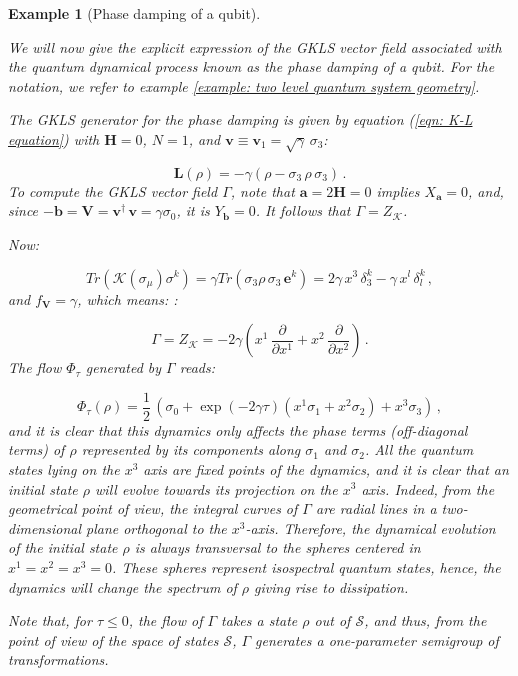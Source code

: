 \documentclass[11pt]{article}
\newcommand{\be}{\begin{equation}}
\newcommand{\ee}{\end{equation}}
\newcommand{\stsp}{\mathcal{S}}
\newtheorem{exmp}{Example}
\begin{document}
\begin{exmp}[Phase damping of a qubit]\label{example: Phase damping of a qubit}

We will now give the explicit expression of the GKLS vector field associated with the quantum dynamical process known as the phase damping of a qubit.
For the notation, we refer to example  \ref{example: two level quantum system geometry}.

The GKLS generator for the phase damping is given by equation (\ref{eqn: K-L equation}) with $\mathbf{H}=0$, $N=1$,  and $\mathbf{v}\equiv\mathbf{v}_{1}=\sqrt{\gamma}\,\sigma_{3}$:

\be
\mathbf{L}(\rho)=- \gamma \left(\rho - \sigma_{3}\,\rho\,\sigma_{3}\right)\,.
\ee
To compute the GKLS vector field $\Gamma$, note that $\mathbf{a}=2\mathbf{H}=0$ implies $X_{\mathbf{a}}=0$, and, since $-\mathbf{b}=\mathbf{V}=\mathbf{v}^{\dagger}\,\mathbf{v}=\gamma\sigma_{0}$, it is $Y_{\mathbf{b}}=0$.
It follows that $\Gamma = Z_{\mathcal{K}}$.

Now:

\be
Tr\left(\mathcal{K}(\sigma_{\mu})\sigma^{k}\right)= \gamma Tr\left(\sigma_{3}\rho\,\sigma_{3}\,\mathbf{e}^{k}\right)= 2\gamma\,x^{3}\,\delta_{3}^{k} - \gamma \, x^{l}\,\delta_{l}^{k}\,,
\ee
and $f_{\mathbf{V}}= \gamma$, which means: 
:

\be\label{eqn: GKLS vector field phase damping qubit}
\Gamma = Z_{\mathcal{K}} = -2\gamma\left(x^{1}\,\frac{\partial}{\partial x^{1}} + x^{2}\,\frac{\partial}{\partial x^{2}}\right)\,.
\ee
The flow $\Phi_{\tau}$ generated by $\Gamma$ reads:

\be
\Phi_{\tau}(\rho)=\frac{1}{2}\,\left(\sigma_{0} + \exp(-2\gamma\tau)\left(x^{1}\sigma_{1} + x^{2}\sigma_{2}\right) + x^{3}\sigma_{3}\right)\,,
\ee
and it is clear that this dynamics only affects the phase terms (off-diagonal terms) of $\rho$ represented by its components along $\sigma_{1}$ and $\sigma_{2}$.
All the quantum states lying on the $x^{3}$ axis are fixed points of the dynamics, and it is clear that an initial state $\rho$ will evolve towards its projection on the $x^{3}$ axis.
Indeed, from the geometrical point of view, the integral curves of $\Gamma$ are radial lines in a two-dimensional plane orthogonal to the $x^{3}$-axis.
Therefore, the dynamical evolution of the initial state $\rho$ is always transversal to the spheres centered in $x^{1}=x^{2}=x^{3}=0$.
These spheres represent isospectral  quantum states, hence, the dynamics will change the spectrum of $\rho$ giving rise to dissipation.



Note that, for $\tau\leq0$, the flow of $\Gamma$ takes a state $\rho$ out of $\stsp$, and thus, from the point of view of the space of states $\stsp$, $\Gamma$ generates a one-parameter semigroup of transformations.





\end{exmp}
\end{document}
